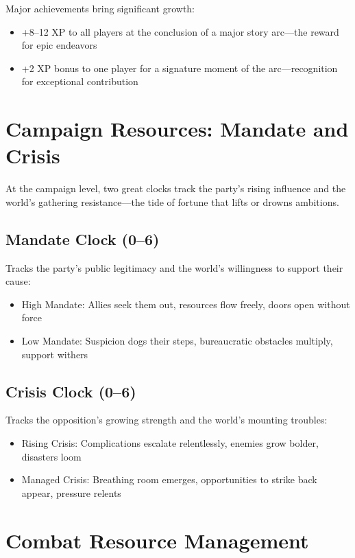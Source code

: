 Major achievements bring significant growth:

\begin{itemize}
    \item +8--12 XP to all players at the conclusion of a major story arc—the reward for epic endeavors
    \item +2 XP bonus to one player for a signature moment of the arc—recognition for exceptional contribution
\end{itemize}

\section*{Campaign Resources: Mandate and Crisis}

At the campaign level, two great clocks track the party's rising influence and the world's gathering resistance—the tide of fortune that lifts or drowns ambitions.

\subsection*{Mandate Clock (0--6)}

Tracks the party's public legitimacy and the world's willingness to support their cause:
\begin{itemize}
    \item High Mandate: Allies seek them out, resources flow freely, doors open without force
    \item Low Mandate: Suspicion dogs their steps, bureaucratic obstacles multiply, support withers
\end{itemize}

\subsection*{Crisis Clock (0--6)}

Tracks the opposition's growing strength and the world's mounting troubles:
\begin{itemize}
    \item Rising Crisis: Complications escalate relentlessly, enemies grow bolder, disasters loom
    \item Managed Crisis: Breathing room emerges, opportunities to strike back appear, pressure relents
\end{itemize}

\section*{Combat Resource Management}

